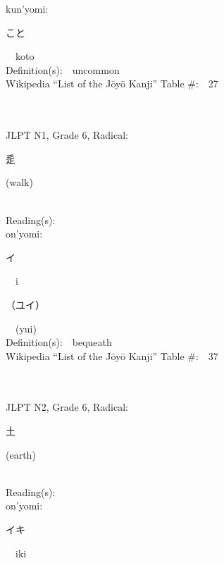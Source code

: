 \begin{multicols}{2}
{\hspace*{1em}}kun'yomi:\ \ \\
{\hspace*{2em}}{\begin{CJK}{UTF8}{min} こと \end{CJK}}\ \ koto\ \ \\
Definition(s):\ \ uncommon \\
Wikipedia ``List of the J\=oy\=o Kanji'' Table \#:\ \ 27 \\
\ \ \\
{\fontsize{34pt}{40pt}  }\ \ \\  %
{JLPT N1, Grade 6, Radical:\ \ {\begin{CJK}{UTF8}{min} 辵 \end{CJK}} (walk) } \\
Reading(s):\ \ \\
{\hspace*{1em}}on'yomi:\ \ \\
{\hspace*{2em}}{\begin{CJK}{UTF8}{min} イ \end{CJK}}\ \ i\ \ \\
{\hspace*{2em}}{\begin{CJK}{UTF8}{min} （ユイ） \end{CJK}}\ \ (yui)\ \ \\
Definition(s):\ \ bequeath \\
Wikipedia ``List of the J\=oy\=o Kanji'' Table \#:\ \ 37 \\
\ \ \\
{\fontsize{34pt}{40pt}  }\ \ \\  %
{JLPT N2, Grade 6, Radical:\ \ {\begin{CJK}{UTF8}{min} 土 \end{CJK}} (earth) } \\
Reading(s):\ \ \\
{\hspace*{1em}}on'yomi:\ \ \\
{\hspace*{2em}}{\begin{CJK}{UTF8}{min} イキ \end{CJK}}\ \ iki\ \ \\

\end{multicols}
